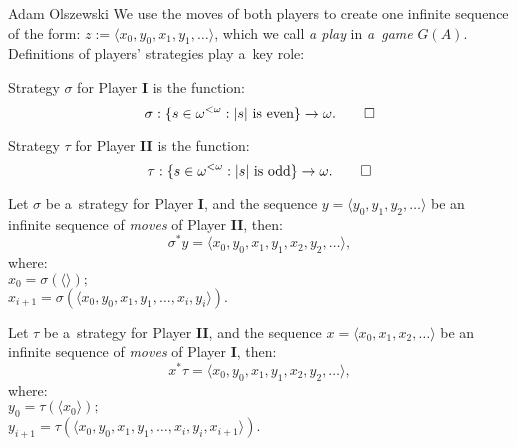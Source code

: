 \begin{artengenv}{Adam Olszewski}
We use the moves of both players to create one infinite sequence of the form: $ z := \langle x_{0}, y_{0}, x_{1}, y_{1}, \ldots \rangle$, which we call \textit{a play} in \textit{a~game} $G(A)$. Definitions of players' strategies play a~key role:
\begingroup\abovedisplayskip=3pt \belowdisplayskip=3pt
\begin{definition}
Strategy $\sigma$ for Player \textbf{I} is the function:
$$\sigma: \{s\in\omega^{<\omega} : |s| \text{ is even}\} \rightarrow \omega.\qedhere$$
\end{definition}
\begin{definition}
Strategy $\tau$ for Player \textbf{II} is the function:
$$\tau: \{s\in\omega^{<\omega} : |s| \text{ is odd}\} \rightarrow \omega.\qedhere$$
\end{definition}
\begin{definition}
Let $\sigma$ be a~strategy for Player \textbf{I}, and the sequence $y = \langle y_{0}, y_{1}, y_{2}, \ldots \rangle$ be an infinite sequence of \textit{moves} of Player \textbf{II}, then:
$$\sigma^*y = \langle x_{0}, y_{0}, x_{1}, y_{1}, x_{2}, y_{2}, \ldots \rangle,$$
where:\\
$x_{0} = \sigma({\langle}{\rangle});$\\
$x_{i+1} = \sigma(\langle x_{0}, y_{0}, x_{1}, y_{1}, \ldots, x_{i}, y_{i} \rangle).$
\end{definition}
\begin{definition}
Let $\tau$ be a~strategy for Player \textbf{II}, and the sequence $x = \langle x_{0}, x_{1}, x_{2}, \ldots \rangle$ be an infinite sequence of \textit{moves} of Player \textbf{I}, then:
$$x^*\tau = \langle x_{0}, y_{0}, x_{1}, y_{1}, x_{2}, y_{2}, \ldots \rangle,$$
where:\\
$y_{0} = \tau(\langle x_{0} \rangle);$\\
$y_{i+1} = \tau(\langle x_{0}, y_{0}, x_{1}, y_{1}, \ldots, x_{i}, y_{i}, x_{i+1} \rangle).$
\end{definition}
\endgroup


\end{artengenv}
